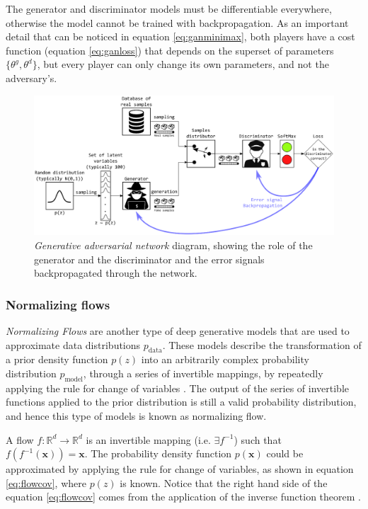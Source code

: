 The generator and discriminator models must be differentiable everywhere, otherwise the model cannot be trained with backpropagation. As an important detail that can be noticed in equation \ref{eq:ganminimax}, both players have a cost function (equation \ref{eq:ganloss}) that depends on the superset  of parameters $\{\theta^g, \theta^d\}$, but every player can only change its own parameters, and not the adversary's.

\begin{figure}[h!]
	\centering
	\includegraphics[width=1\textwidth]{background/images/police_counterfeiter.eps}
	\caption[Generative adversarial network]{\textit{Generative adversarial network} diagram, showing the role of the generator and the discriminator and the error signals backpropagated through the network.}
	\label{fig:police_counterfeiter}
\end{figure}

\subsubsection{Normalizing flows} \label{sec:flows}
\textit{Normalizing Flows} are another type of deep generative models that are used to approximate data distributions $p_\mathrm{data}$. These models describe the transformation of a prior density function $p(z)$ into an arbitrarily complex probability distribution $p_\mathrm{model}$, through a series of invertible mappings, by repeatedly applying the rule for change of variables \autocite{rezende2015}. The output of the series of invertible functions applied to the prior distribution is still a valid probability distribution, and hence this type of models is known as normalizing flow.

A flow $f: \mathbb{R}^d \rightarrow \mathbb{R}^d$ is an invertible mapping (i.e. $\exists f^{-1}$) such that $f(f^{-1}(\mathbf{x})) = \mathbf{x}$. The probability density function $p(\mathbf{x})$ could be approximated by applying the rule for change of variables, as shown in equation \ref{eq:flowcov}, where $p(z)$ is known. Notice that the right hand side of the  equation \ref{eq:flowcov} comes from the application of the inverse function theorem \autocite{rezende2015}.

